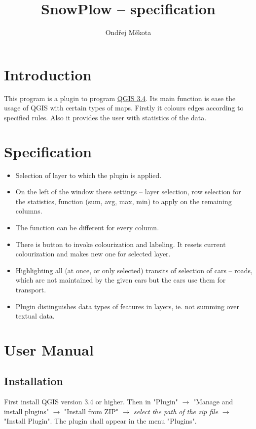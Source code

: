 \documentclass[12pt,a4paper]{article}
\begin{document}
\title{SnowPlow – specification}
\author{Ondřej Měkota}

\maketitle
\pagebreak
\tableofcontents
\pagebreak
\section{Introduction}

\par This program is a plugin to program \href{https://qgis.org/en/site/index.html}{QGIS 3.4}. 
Its main function is ease the usage of QGIS with certain types of maps.
Firstly it colours edges according to specified rules.
Also it provides the user with statistics of the data.


\section{Specification}
\begin{itemize}
    \item Selection of layer to which the plugin is applied.
    \item On the left of the window there settings – layer selection, row selection for the statistics, function (sum, avg, max, min) to apply on the remaining columns.
    \item The function can be different for every column.
    \item There is button to invoke colourization and labeling. It resets current colourization and makes new one for selected layer.
    \item Highlighting all (at once, or only selected) transits of selection of cars – roads, which are not maintained by the given cars but the cars use them for transport. 
    \item Plugin distinguishes data types of features in layers, ie. not summing over textual data. 
\end{itemize}

\pagebreak
\section{User Manual}
\subsection{Installation}
First install QGIS version 3.4 or higher. 
Then in "Plugin" $\rightarrow$ "Manage and install plugins" $\rightarrow$ "Install from ZIP" $\rightarrow$ \emph{select the path of the zip file} $\rightarrow$ "Install Plugin".
The plugin shall appear in the menu "Plugins".
\end{document}
